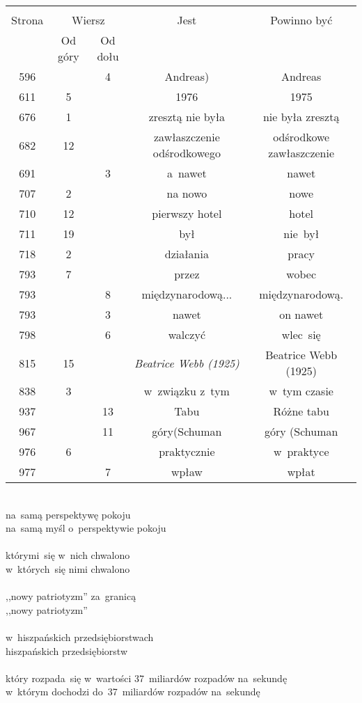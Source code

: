 \documentclass[a4paper,11pt]{article}
\begin{document}
\begin{center}
  \begin{tabular}{|c|c|c|c|c|}
    \hline
    & \multicolumn{2}{c|}{} & & \\
    Strona & \multicolumn{2}{c|}{Wiersz} & Jest
                              & Powinno być \\ \cline{2-3}
    & Od góry & Od dołu & & \\
    \hline
    596 & &  4 & Andreas) & Andreas \\
    611 &  5 & & 1976 & 1975 \\
    676 &  1 & & zresztą nie była & nie była zresztą \\
    682 & 12 & & zawłaszczenie odśrodkowego & odśrodkowe zawłaszczenie \\
    691 & &  3 & a~nawet & nawet \\
    707 &  2 & & na nowo & nowe \\
    710 & 12 & & pierwszy hotel & hotel \\
    711 & 19 & & był & nie~był \\
    718 &  2 & & działania & pracy \\
    793 &  7 & & przez & wobec \\
    793 & &  8 & międzynarodową... & międzynarodową. \\
    793 & &  3 & nawet & on nawet \\
    798 & &  6 & walczyć & wlec~się \\
    815 & 15 & & \emph{Beatrice Webb (1925)} & Beatrice Webb (1925) \\
    838 &  3 & & w~związku z~tym & w~tym czasie \\
    937 & & 13 & Tabu & Różne tabu \\
    967 & & 11 & góry(Schuman & góry (Schuman \\
    976 &  6 & & praktycznie & w~praktyce \\
    977 & &  7 & wpław & wpłat \\
    \hline
  \end{tabular}
\end{center}
\noi
{} \\
\Jest  na~samą perspektywę pokoju \\
\Powin na~samą myśl o~perspektywie pokoju \\
 \\
\Jest  którymi~się w~nich chwalono \\
\Powin w~których~się nimi chwalono \\
 \\
\Jest  ,,nowy patriotyzm'' za~granicą \\
\Powin ,,nowy patriotyzm'' \\
 \\
\Jest  w~hiszpańskich przedsiębiorstwach \\
\Powin hiszpańskich przedsiębiorstw \\
 \\
\Jest  który rozpada~się w~wartości 37~miliardów rozpadów na~sekundę \\
\Powin w~którym dochodzi do~37~miliardów rozpadów na~sekundę \\
\end{document}
